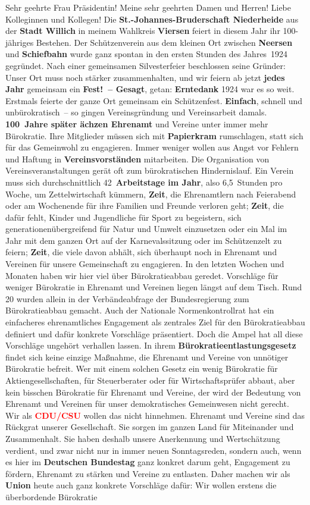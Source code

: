 \documentclass{article}
\begin{document}
Sehr geehrte Frau Präsidentin! Meine sehr geehrten Damen und Herren! Liebe Kolleginnen und Kollegen! Die \textbf{St.-Johannes-Bruderschaft Niederheide} aus der \textbf{Stadt Willich} in meinem Wahlkreis \textbf{Viersen} feiert in diesem Jahr ihr 100-jähriges Bestehen. Der Schützenverein aus dem kleinen Ort zwischen \textbf{Neersen} und \textbf{Schiefbahn} wurde ganz spontan in den ersten Stunden des Jahres 1924 gegründet. Nach einer gemeinsamen Silvesterfeier beschlossen seine Gründer: Unser Ort muss noch stärker zusammenhalten, und wir feiern ab jetzt \textbf{jedes Jahr} gemeinsam ein \textbf{Fest! – Gesagt}, getan: \textbf{Erntedank} 1924 war es so weit. Erstmals feierte der ganze Ort gemeinsam ein Schützenfest. \textbf{Einfach}, schnell und unbürokratisch – so gingen Vereinsgründung und Vereinsarbeit damals. \textbf{100 Jahre später ächzen Ehrenamt} und Vereine unter immer mehr Bürokratie. Ihre Mitglieder müssen sich mit \textbf{Papierkram} rumschlagen, statt sich für das Gemeinwohl zu engagieren. Immer weniger wollen aus Angst vor Fehlern und Haftung in \textbf{Vereinsvorständen} mitarbeiten. Die Organisation von Vereinsveranstaltungen gerät oft zum bürokratischen Hindernislauf. Ein Verein muss sich durchschnittlich 42 \textbf{Arbeitstage im Jahr}, also 6,5 Stunden pro Woche, um Zettelwirtschaft kümmern,  \textbf{Zeit}, die Ehrenamtlern nach Feierabend oder am Wochenende für ihre Familien und Freunde verloren geht; \textbf{Zeit}, die dafür fehlt, Kinder und Jugendliche für Sport zu begeistern, sich generationenübergreifend für Natur und Umwelt einzusetzen oder ein Mal im Jahr mit dem ganzen Ort auf der Karnevalssitzung oder im Schützenzelt zu feiern; \textbf{Zeit}, die viele davon abhält, sich überhaupt noch in Ehrenamt und Vereinen für unsere Gemeinschaft zu engagieren.  In den letzten Wochen und Monaten haben wir hier viel über Bürokratieabbau geredet. Vorschläge für weniger Bürokratie in Ehrenamt und Vereinen liegen längst auf dem Tisch. Rund 20 wurden allein in der Verbändeabfrage der Bundesregierung zum Bürokratieabbau gemacht. Auch der Nationale Normenkontrollrat hat ein einfacheres ehrenamtliches Engagement als zentrales Ziel für den Bürokratieabbau definiert und dafür konkrete Vorschläge präsentiert. Doch die Ampel hat all diese Vorschläge ungehört verhallen lassen. In ihrem \textbf{Bürokratieentlastungsgesetz} findet sich keine einzige Maßnahme, die Ehrenamt und Vereine von unnötiger Bürokratie befreit. Wer mit einem solchen Gesetz ein wenig Bürokratie für Aktiengesellschaften, für Steuerberater oder für Wirtschaftsprüfer abbaut, aber kein bisschen Bürokratie für Ehrenamt und Vereine, der wird der Bedeutung von Ehrenamt und Vereinen für unser demokratisches Gemeinwesen nicht gerecht.  Wir als \textcolor{red}{\textbf{CDU/CSU}} wollen das nicht hinnehmen. Ehrenamt und Vereine sind das Rückgrat unserer Gesellschaft. Sie sorgen im ganzen Land für Miteinander und Zusammenhalt. Sie haben deshalb unsere Anerkennung und Wertschätzung verdient, und zwar nicht nur in immer neuen Sonntagsreden, sondern auch, wenn es hier im \textbf{Deutschen Bundestag} ganz konkret darum geht, Engagement zu fördern, Ehrenamt zu stärken und Vereine zu entlasten.  Daher machen wir als \textbf{Union} heute auch ganz konkrete Vorschläge dafür: Wir wollen erstens die überbordende Bürokratie 
\end{document}
